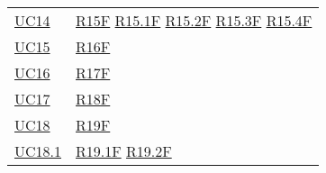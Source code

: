 \begin{center}
\begin{longtable}[!h]{m{50px} m{50px}}
        \hyperref[sec:UC14]{UC14}         & \hyperref[tab:RequisitiFunzionali]{R15F}
        \newline \hyperref[tab:RequisitiFunzionali]{R15.1F}
        \newline \hyperref[tab:RequisitiFunzionali]{R15.2F}
        \newline \hyperref[tab:RequisitiFunzionali]{R15.3F}
        \newline \hyperref[tab:RequisitiFunzionali]{R15.4F}                            \\

        \hyperref[sec:UC15]{UC15}         & \hyperref[tab:RequisitiFunzionali]{R16F}   \\
        \hyperref[sec:UC16]{UC16}         & \hyperref[tab:RequisitiFunzionali]{R17F}   \\
        \hyperref[sec:UC17]{UC17}         & \hyperref[tab:RequisitiFunzionali]{R18F}   \\
        \hyperref[sec:UC18]{UC18}         & \hyperref[tab:RequisitiFunzionali]{R19F}   \\

        \hyperref[sec:UC18.1]{UC18.1}     & \hyperref[tab:RequisitiFunzionali]{R19.1F}
        \newline \hyperref[tab:RequisitiFunzionali]{R19.2F}                            \\


\end{longtable}
\end{center}
